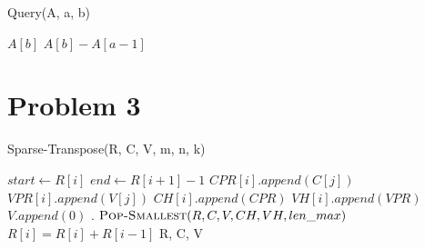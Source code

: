 \documentclass[11pt]{article}
\begin{document}
\begin{algorithm}[H]
\caption{Query(A, a, b)}\label{Query}
    \begin{algorithmic}[1]
            \State \Return $A[b]$
        \Else
            \State \Return $A[b] - A[a-1]$
        \EndIf
        \EndProcedure
    \end{algorithmic}
\end{algorithm}

\section{Problem 3}


\begin{algorithm}[H]
\caption{Sparse-Transpose(R, C, V, m, n, k)}\label{transpose}
    \begin{algorithmic}[1]
        \State {}
        \State {}
            \State $start \gets R[i]$
            \State $end \gets R[i+1]-1$
            \State {}
            \State {}
                \State $CPR[i].append(C[j])$
                \State $VPR[i].append(V[j])$
            \EndFor
            \State $CH[i].append(CPR)$
            \State $VH[i].append(VPR)$
        \EndFor
        \State {}
        \State {}
        \State {}
        \State $V.append(0)$
        \State {}.
            \State $\textsc{Pop-Smallest}(R, C, V, CH, VH, len\_max)$
        \EndFor
            \State $R[i] = R[i] + R[i-1]$
        \EndFor
        \State \Return R, C, V
        \EndProcedure
    \end{algorithmic}
\end{algorithm}
\end{document}

